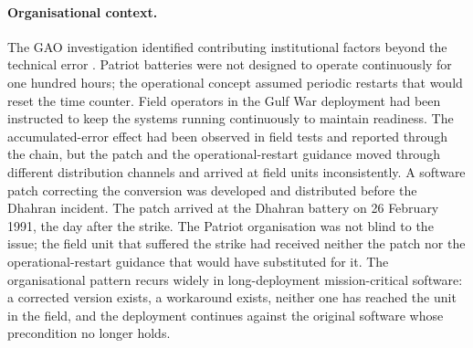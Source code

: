 \paragraph{Organisational context.}
The GAO investigation identified contributing institutional factors
beyond the technical error \cite{acc:gao-patriot-1992}. Patriot
batteries were not designed to operate continuously for one hundred
hours; the operational concept assumed periodic restarts that would
reset the time counter. Field operators in the Gulf War deployment
had been instructed to keep the systems running continuously to
maintain readiness. The accumulated-error effect had been observed
in field tests and reported through the chain, but the patch and
the operational-restart guidance moved through different
distribution channels and arrived at field units inconsistently.
A software patch correcting the conversion was developed and
distributed before the Dhahran incident. The patch arrived at the
Dhahran battery on 26 February 1991, the day after the strike.
The Patriot organisation was not blind to the issue; the field unit
that suffered the strike had received neither the patch nor the
operational-restart guidance that would have substituted for it.
The organisational pattern recurs widely in long-deployment
mission-critical software: a corrected version exists, a workaround
exists, neither one has reached the unit in the field, and the
deployment continues against the original software whose
precondition no longer holds.

